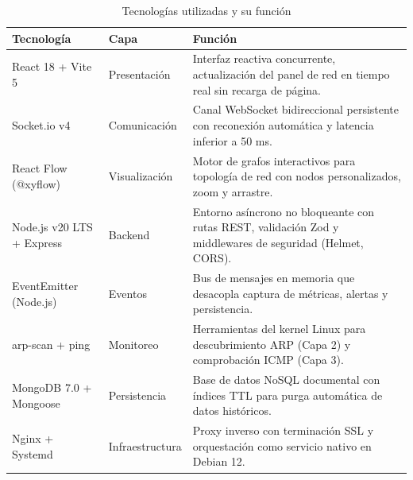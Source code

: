 \documentclass[12pt,a4paper]{report}
\begin{document}
\begin{table}[htbp]
\centering
\caption{Tecnologías utilizadas y su función}\label{tab:stack}
\small
\begin{tabularx}{\textwidth}{p{3.8cm} p{2.5cm} X}
\toprule
\textbf{Tecnología} & \textbf{Capa} & \textbf{Función} \\
\midrule
React 18 + Vite 5 & Presentación & Interfaz reactiva concurrente, actualización del panel de red en tiempo real sin recarga de página. \\
\midrule
Socket.io v4 & Comunicación & Canal WebSocket bidireccional persistente con reconexión automática y latencia inferior a 50 ms. \\
\midrule
React Flow (@xyflow) & Visualización & Motor de grafos interactivos para topología de red con nodos personalizados, zoom y arrastre. \\
\midrule
Node.js v20 LTS + Express & Backend & Entorno asíncrono no bloqueante con rutas REST, validación Zod y middlewares de seguridad (Helmet, CORS). \\
\midrule
EventEmitter (Node.js) & Eventos & Bus de mensajes en memoria que desacopla captura de métricas, alertas y persistencia. \\
\midrule
arp-scan + ping & Monitoreo & Herramientas del kernel Linux para descubrimiento ARP (Capa 2) y comprobación ICMP (Capa 3). \\
\midrule
MongoDB 7.0 + Mongoose & Persistencia & Base de datos NoSQL documental con índices TTL para purga automática de datos históricos. \\
\midrule
Nginx + Systemd & Infraestructura & Proxy inverso con terminación SSL y orquestación como servicio nativo en Debian 12. \\
\bottomrule
\end{tabularx}
\end{table}
\end{document}
